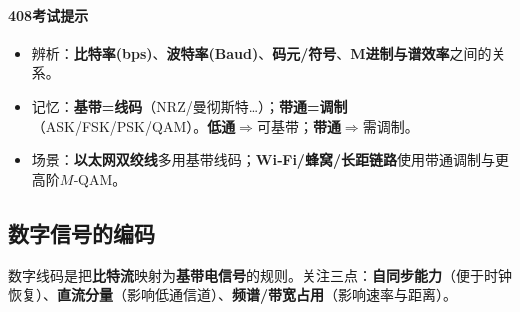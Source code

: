 \documentclass[lang=cn,newtx,10pt,scheme=chinese]{../../elegantbook}
\begin{document}
\paragraph{408考试提示}
\begin{itemize}
    \item 辨析：\textbf{比特率(bps)}、\textbf{波特率(Baud)}、\textbf{码元/符号}、\textbf{M进制与谱效率}之间的关系。
    \item 记忆：\textbf{基带=线码}（NRZ/曼彻斯特…）；\textbf{带通=调制}（ASK/FSK/PSK/QAM）。\textbf{低通}$\Rightarrow$可基带；\textbf{带通}$\Rightarrow$需调制。
    \item 场景：\textbf{以太网双绞线}多用基带线码；\textbf{Wi‑Fi/蜂窝/长距链路}使用带通调制与更高阶$M$‑QAM。
\end{itemize}
\subsection{数字信号的编码}
数字线码是把\textbf{比特流}映射为\textbf{基带电信号}的规则。关注三点：\textbf{自同步能力}（便于时钟恢复）、\textbf{直流分量}（影响低通信道）、\textbf{频谱/带宽占用}（影响速率与距离）。
\end{document}

